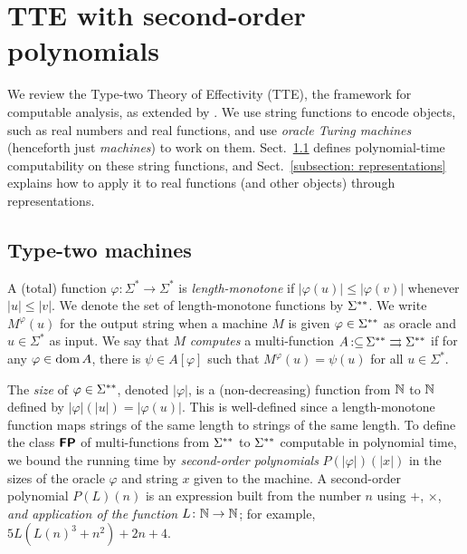 \documentclass[a4paper,UKenglish]{lipics}
\newcommand{\pcolon}{\mathpunct{\,:\subseteq}}
\begin{document}

\section{TTE with second-order polynomials}
\label{section: computable analysis}

We review the Type-two Theory of Effectivity (TTE), 
the framework for computable analysis, 
as extended by 
\cite{kawamura2012complexity}. 
We use string functions to 
encode objects, such as real numbers and real functions, 
and use \emph{oracle Turing machines} (henceforth just \emph{machines}) 
to work on them.
Sect.~\ref{section:TTF} defines polynomial-time computability on 
these string functions, 
and Sect.~\ref{subsection: representations} explains how to 
apply it to real functions (and other objects) through representations. 

\subsection{Type-two machines}
\label{section:TTF}

A (total) function $\varphi \colon \Sigma^* \to \Sigma^*$ is \emph{length-monotone}
if $|\varphi(u)| \le |\varphi(v)|$ whenever $|u| \le |v|$.
We denote the set of length-monotone functions by $\Sigma ^{**}$.
We write $M ^\varphi (u)$ for the output string 
when a machine $M$ is given
$\varphi \in \Sigma ^{**}$ as oracle and $u \in \Sigma ^*$ as input.
We say that $M$ \emph{computes} 
a multi-function $A \pcolon \LM \rightrightarrows \LM$ if 
for any $\varphi \in \mathop{\rm dom} A$, there is $\psi \in A[\varphi]$ 
such that $M^\varphi(u) = \psi(u)$ for all $u \in \Sigma^*$.

The \emph{size} of $\varphi \in \Sigma ^{**}$, denoted $|\varphi|$,
is a (non-decreasing) function from $\mathbb N$ to $\mathbb N$ defined by 
$|\varphi|(|u|) = |\varphi(u)|$.
This is well-defined since a length-monotone function maps 
strings of the same length to strings of the same length.
To define the class $\text{\bfseries \sffamily \upshape FP}$ of 
multi-functions from $\Sigma ^{**}$ to $\Sigma ^{**}$ 
computable in polynomial time, 
we bound the running time by \emph{second-order polynomials} 
$P (\lvert \varphi \rvert) (\lvert x \rvert)$ 
in the sizes of the oracle $\varphi$ and string $x$
given to the machine. 
A second-order polynomial $P (L) (n)$ 
is an expression built from the number $n$ 
using $\mathord+$, $\mathord\times$, 
\emph{and application of the function $L \colon \mathbb N \to \mathbb N$}; 
for example, 
$5 L (L (n) ^3 + n^2) + 2 n + 4$. 
\end{document}

